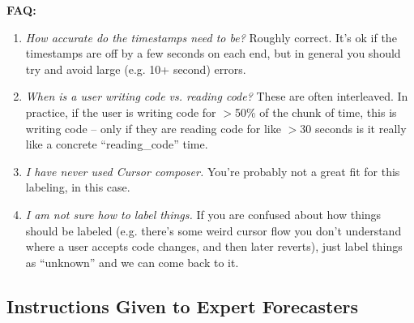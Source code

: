 \documentclass{article}
\begin{document}
\begin{instructionbox}
\textbf{FAQ:}
\begin{enumerate}
    \item \emph{How accurate do the timestamps need to be?} Roughly correct. It’s ok if the timestamps are off by a few seconds on each end, but in general you should try and avoid large (e.g. 10+ second) errors.
    \item \emph{When is a user writing code vs. reading code?} These are often interleaved. In practice, if the user is writing code for $>$50\% of the chunk of time, this is writing code – only if they are reading code for like $>$30 seconds is it really like a concrete “reading\_code” time. 
    \item \emph{I have never used Cursor composer.} You’re probably not a great fit for this labeling, in this case. 
    \item \emph{I am not sure how to label things.} If you are confused about how things should be labeled (e.g. there’s some weird cursor flow you don’t understand where a user accepts code changes, and then later reverts), just label things as “unknown” and we can come back to it.
\end{enumerate}

\end{instructionbox}

\subsection{Instructions Given to Expert Forecasters}
\label{sec:instructions-given-to-expert-forecasters}
\end{document}
